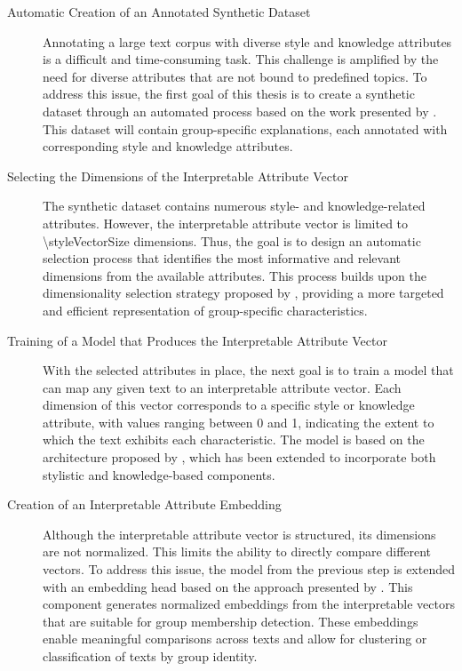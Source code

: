 \begin{description}
  \item[Automatic Creation of an Annotated Synthetic Dataset]
        Annotating a large text corpus with diverse style and knowledge attributes is a difficult and time-consuming task. This challenge is amplified by the need for diverse attributes that are not bound to predefined topics. To address this issue, the first goal of this thesis is to create a synthetic dataset through an automated process based on the work presented by \citet{patelLearningInterpretableStyle2023}. This dataset will contain group-specific explanations, each annotated with corresponding style and knowledge attributes.

  \item[Selecting the Dimensions of the Interpretable Attribute Vector]\hspace{\maxstretch}
        The synthetic dataset contains numerous style- and knowledge-related attributes. However, the interpretable attribute vector is limited to \num{\styleVectorSize} dimensions. Thus, the goal is to design an automatic selection process that identifies the most informative and relevant dimensions from the available attributes. This process builds upon the dimensionality selection strategy proposed by \citet{patelLearningInterpretableStyle2023}, providing a more targeted and efficient representation of group-specific characteristics.

  \item[Training of a Model that Produces the Interpretable Attribute Vector]
        With the selected attributes in place, the next goal is to train a model that can map any given text to an interpretable attribute vector. Each dimension of this vector corresponds to a specific style or knowledge attribute, with values ranging between \num{0} and \num{1}, indicating the extent to which the text exhibits each characteristic. The model is based on the architecture proposed by \citet{patelLearningInterpretableStyle2023}, which has been extended to incorporate both stylistic and knowledge-based components.

  \item[Creation of an Interpretable Attribute Embedding]\hphantom{at}
        Although the interpretable attribute vector is structured, its dimensions are not normalized. This limits the ability to directly compare different vectors. To address this issue, the model from the previous step is extended with an embedding head based on the approach presented by \citet{patelLearningInterpretableStyle2023}. This component generates normalized embeddings from the interpretable vectors that are suitable for group membership detection. These embeddings enable meaningful comparisons across texts and allow for clustering or classification of texts by group identity.


\end{description}
